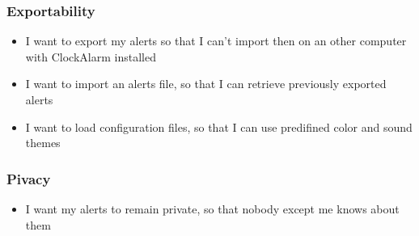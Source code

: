 \subsubsection{Exportability}
\begin{itemize}
	\item I want to export my alerts so that I can't import then on an other computer with ClockAlarm installed
	\item I want to import an alerts file, so that I can retrieve previously exported alerts
	\item I want to load configuration files, so that I can use predifined color and sound themes
\end{itemize}
\subsubsection{Pivacy}
\begin{itemize}
	\item I want my alerts to remain private, so that nobody except me knows about them
\end{itemize}